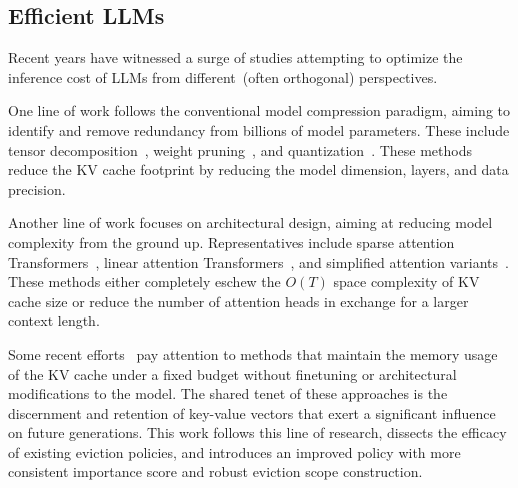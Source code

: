 \subsection{Efficient LLMs}
Recent years have witnessed a surge of studies attempting to optimize the inference cost of LLMs from different~(often orthogonal) perspectives.

One line of work follows the conventional model compression paradigm, aiming to identify and remove redundancy from billions of model parameters. These include tensor decomposition~\cite{dao2022monarch}, weight pruning~\cite{frantar2023massive,xia2023sheared,slicegpt}, and quantization~\cite{dettmers2022llm,gptq,smoothquant}. These methods reduce the KV cache footprint by reducing the model dimension, layers, and data precision.

Another line of work focuses on architectural design, aiming at reducing model complexity from the ground up. Representatives include sparse attention Transformers~\cite{child2019generating,bigbird}, linear attention Transformers~\cite{linformer,performer,qin-etal-2022-devil}, and simplified attention variants~\cite{mqa,gqa}. These methods either completely eschew the $O(T)$ space complexity of KV cache size or reduce the number of attention heads in exchange for a larger context length.

Some recent efforts~\cite{liu2023scissorhands,h2o,tova} pay attention to methods that maintain the memory usage of the KV cache under a fixed budget without finetuning or architectural modifications to the model. The shared tenet of these approaches is the discernment and retention of key-value vectors that exert a significant influence on future generations.
This work follows this line of research, dissects the efficacy of existing eviction policies, and introduces an improved policy with more consistent importance score and robust eviction scope construction.
